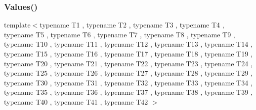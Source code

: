 \mbox{\label{namespacetesting_a0951fc3989cde27914791eb120f8f01c}} 
\subsubsection{\texorpdfstring{Values()}{Values()}\hspace{0.1cm}{\footnotesize\ttfamily [42/50]}}
{\footnotesize\ttfamily template$<$typename T1 , typename T2 , typename T3 , typename T4 , typename T5 , typename T6 , typename T7 , typename T8 , typename T9 , typename T10 , typename T11 , typename T12 , typename T13 , typename T14 , typename T15 , typename T16 , typename T17 , typename T18 , typename T19 , typename T20 , typename T21 , typename T22 , typename T23 , typename T24 , typename T25 , typename T26 , typename T27 , typename T28 , typename T29 , typename T30 , typename T31 , typename T32 , typename T33 , typename T34 , typename T35 , typename T36 , typename T37 , typename T38 , typename T39 , typename T40 , typename T41 , typename T42 $>$ \\
}
